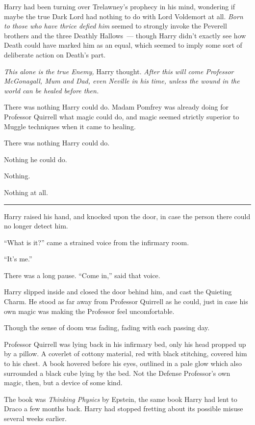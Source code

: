 Harry had been turning over Trelawney's prophecy in his mind, wondering if maybe the true Dark Lord had nothing to do with Lord Voldemort at all. \emph{Born to those who have thrice defied him} seemed to strongly invoke the Peverell brothers and the three Deathly Hallows~--- though Harry didn't exactly see how Death could have marked him as an equal, which seemed to imply some sort of deliberate action on Death's part.

\emph{This alone is the true Enemy,} Harry thought. \emph{After this will come Professor McGonagall, Mum and Dad, even Neville in his time, unless the wound in the world can be healed before then.}

There was nothing Harry could do. Madam Pomfrey was already doing for Professor Quirrell what magic could do, and magic seemed strictly superior to Muggle techniques when it came to healing.

There was nothing Harry could do.

Nothing he could do.

Nothing.

Nothing at all.

\begin{center}\rule{3in}{0.4pt}\end{center}

Harry raised his hand, and knocked upon the door, in case the person there could no longer detect him.

``What is it?'' came a strained voice from the infirmary room.

``It's me.''

There was a long pause. ``Come in,'' said that voice.

Harry slipped inside and closed the door behind him, and cast the Quieting Charm. He stood as far away from Professor Quirrell as he could, just in case his own magic was making the Professor feel uncomfortable.

Though the sense of doom was fading, fading with each passing day.

Professor Quirrell was lying back in his infirmary bed, only his head propped up by a pillow. A coverlet of cottony material, red with black stitching, covered him to his chest. A book hovered before his eyes, outlined in a pale glow which also surrounded a black cube lying by the bed. Not the Defense Professor's own magic, then, but a device of some kind.

The book was \emph{Thinking Physics} by Epstein, the same book Harry had lent to Draco a few months back. Harry had stopped fretting about its possible misuse several weeks earlier.

